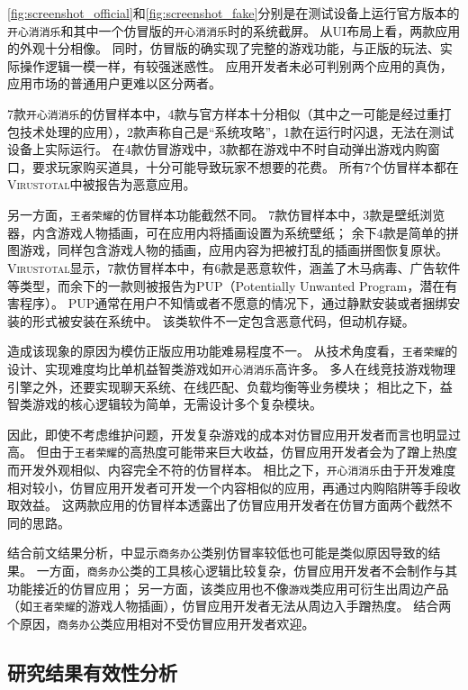 \autoref{fig:screenshot_official}和\autoref{fig:screenshot_fake}分别是在测试设备上运行官方版本的\texttt{开心消消乐}和其中一个仿冒版的\texttt{开心消消乐}时的系统截屏。
从UI布局上看，两款应用的外观十分相像。
同时，仿冒版的确实现了完整的游戏功能，与正版的玩法、实际操作逻辑一模一样，有较强迷惑性。
应用开发者未必可判别两个应用的真伪，应用市场的普通用户更难以区分两者。

7款\texttt{开心消消乐}的仿冒样本中，4款与官方样本十分相似（其中之一可能是经过重打包技术处理的应用），2款声称自己是``系统攻略''，1款在运行时闪退，无法在测试设备上实际运行。
在4款仿冒游戏中，3款都在游戏中不时自动弹出游戏内购窗口，要求玩家购买道具，十分可能导致玩家不想要的花费。
所有7个仿冒样本都在\textsc{Virustotal}中被报告为恶意应用。

另一方面，\texttt{王者荣耀}的仿冒样本功能截然不同。
7款仿冒样本中，3款是壁纸浏览器，内含游戏人物插画，可在应用内将插画设置为系统壁纸；
余下4款是简单的拼图游戏，同样包含游戏人物的插画，应用内容为把被打乱的插画拼图恢复原状。
\textsc{Virustotal}显示，7款仿冒样本中，有6款是恶意软件，涵盖了木马病毒、广告软件等类型，而余下的一款则被报告为PUP（Potentially Unwanted Program，潜在有害程序）。
PUP通常在用户不知情或者不愿意的情况下，通过静默安装或者捆绑安装的形式被安装在系统中。
该类软件不一定包含恶意代码，但动机存疑。

造成该现象的原因为模仿正版应用功能难易程度不一。
从技术角度看，\texttt{王者荣耀}的设计、实现难度均比单机益智类游戏如\texttt{开心消消乐}高许多。
多人在线竞技游戏物理引擎之外，还要实现聊天系统、在线匹配、负载均衡等业务模块；
相比之下，益智类游戏的核心逻辑较为简单，无需设计多个复杂模块。

因此，即使不考虑维护问题，开发复杂游戏的成本对仿冒应用开发者而言也明显过高。
但由于\texttt{王者荣耀}的高热度可能带来巨大收益，仿冒应用开发者会为了蹭上热度而开发外观相似、内容完全不符的仿冒样本。
相比之下，\texttt{开心消消乐}由于开发难度相对较小，仿冒应用开发者可开发一个内容相似的应用，再通过内购陷阱等手段收取效益。
这两款应用的仿冒样本透露出了仿冒应用开发者在仿冒方面两个截然不同的思路。

结合前文结果分析，中显示\texttt{商务办公}类别仿冒率较低也可能是类似原因导致的结果。
一方面，\texttt{商务办公}类的工具核心逻辑比较复杂，仿冒应用开发者不会制作与其功能接近的仿冒应用；
另一方面，该类应用也不像\texttt{游戏}类应用可衍生出周边产品（如\texttt{王者荣耀}的游戏人物插画），仿冒应用开发者无法从周边入手蹭热度。
结合两个原因，\texttt{商务办公}类应用相对不受仿冒应用开发者欢迎。

\subsection{研究结果有效性分析}

